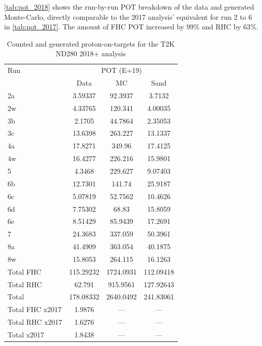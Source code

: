 \autoref{tab:pot_2018} shows the run-by-run POT breakdown of the data and generated Monte-Carlo, directly comparable to the 2017 analysis' equivalent for run 2 to 6 in \autoref{tab:pot_2017}. The amount of FHC POT increased by 99\% and RHC by 63\%.
\begin{table}[h]
	\centering
	\begin{tabular}{ l | c c c }
		\hline
		\hline
		Run &  \multicolumn{3}{c}{POT (E+19)} \\
		    & 	Data & MC & Sand \\
		\hline
		2a  & 3.59337    & 92.3937     & 3.7132  \\
		2w  & 4.33765    & 120.341     & 4.00035 \\
		\hline
		3b  & 2.1705     & 44.7864     & 2.35053 \\
		3c  & 13.6398    & 263.227     & 13.1337 \\
		\hline
		4a  & 17.8271    & 349.96      & 17.4125 \\
		4w  & 16.4277    & 226.216     & 15.9801 \\
		\hline
		5   & 4.3468     & 229.627     & 9.07403 \\
		\hline
		6b  & 12.7301    & 141.74      & 25.9187 \\
		6c  & 5.07819    & 52.7562     & 10.4626 \\
		6d  & 7.75302    & 68.83       & 15.8059 \\
		6e  & 8.51429    & 85.9439     & 17.2691 \\
		\hline
		7   & 24.3683	 & 337.059     & 50.3961 \\
		\hline
		8a  & 41.4909	 & 363.054	   & 40.1875 \\
		8w  & 15.8053    & 264.115 	   & 16.1263 \\
		\hline
		Total FHC & 115.29232 & 1724.0931 &  112.09418 \\
		Total RHC & 62.791 	  & 915.9561  &  127.92643 \\
		\hline
		\hline
		Total 	  & 178.08332 & 2640.0492 &  241.83061 \\
		\hline
		\hline
		Total FHC x2017 & 1.9876 & --- & --- \\
		Total RHC x2017 & 1.6276 & --- & --- \\
		Total x2017 	& 1.8438 & --- & --- \\
		\hline
		\hline
	\end{tabular}
	\caption{Counted and generated proton-on-targets for the T2K ND280 2018+ analysis}
	\label{tab:pot_2018}
\end{table}

